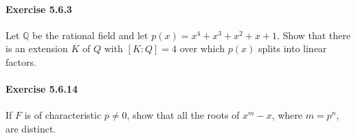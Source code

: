 \documentclass{article}
\begin{document}
\paragraph{Exercise 5.6.3} Let $\mathbb{Q}$ be the rational field and let $p(x) = x^4 + x^3 + x^2 + x + 1$.  Show that there is an extension $K$ of $Q$ with $[K:Q] = 4$ over which $p(x)$ splits into linear factors.

\paragraph{Exercise 5.6.14} If $F$ is of characteristic $p \neq 0$, show that all the roots of $x^m - x$, where $m = p^n$, are distinct.
\end{document}
